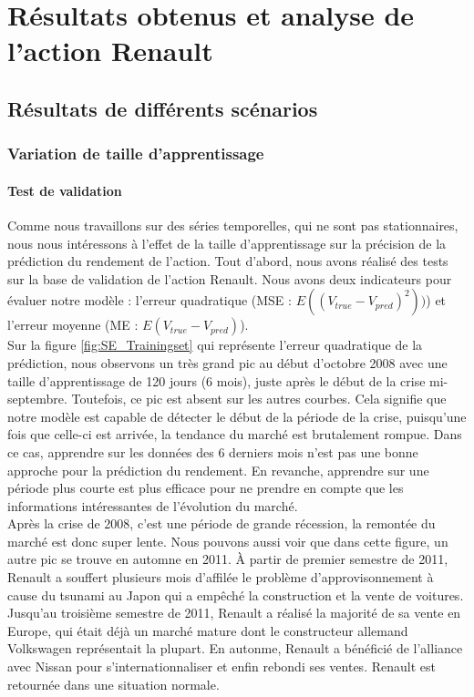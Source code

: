 
\section{Résultats obtenus et analyse de l'action Renault}
 
\subsection{Résultats de différents scénarios}

\subsubsection{Variation de taille d'apprentissage}

\paragraph{Test de validation}
Comme nous travaillons sur des séries temporelles, qui ne sont pas stationnaires, nous nous intéressons à l'effet de la taille d'apprentissage sur la précision de la prédiction du rendement de l'action. Tout d'abord, nous avons réalisé des tests sur la base de validation de l'action Renault. Nous avons deux indicateurs pour évaluer notre modèle : l'erreur quadratique (MSE : $ E((V_{true} - V_{pred})^2) )$) et l'erreur moyenne (ME : $ E(V_{true} - V_{pred})$). \\

Sur la figure \ref{fig:SE_Trainingset} qui représente l'erreur quadratique de la prédiction, nous observons un très grand pic au début d'octobre 2008 avec une taille d'apprentissage de 120 jours (6 mois), juste après le début de la crise mi-septembre. Toutefois, ce pic est absent sur les autres courbes. Cela signifie que notre modèle est capable de détecter le début de la période de la crise, puisqu'une fois que celle-ci est arrivée, la tendance du marché est brutalement rompue. Dans ce cas, apprendre sur les données des 6 derniers mois n'est pas une bonne approche pour la prédiction du rendement. En revanche, apprendre sur une période plus courte est plus efficace pour ne prendre en compte que les informations intéressantes de l'évolution du marché.\\

Après la crise de 2008, c'est une période de grande récession, la remontée du marché est donc super lente. Nous pouvons aussi voir que dans cette figure, un autre pic se trouve en automne en 2011. À partir de premier semestre de 2011, Renault a souffert plusieurs mois d'affilée le problème d'approvisonnement à cause du tsunami au Japon qui a empêché la construction et la vente de voitures. Jusqu'au troisième semestre de 2011, Renault a réalisé la majorité de sa vente en Europe, qui était déjà un marché mature dont le constructeur allemand Volkswagen représentait la plupart. En autonme, Renault a bénéficié de l'alliance avec Nissan pour s'internationnaliser et enfin rebondi ses ventes. Renault est retournée dans une situation normale.\\

